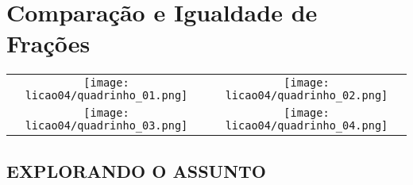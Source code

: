 

\setcounter{chapter}{3}
\chapter{Comparação e Igualdade de Frações }
\setcounter{subsection}{0}
\vspace*{-1.3cm}

\hspace*{-1.3cm}\begin{tabular}{cc}
\texttt{[image: licao04/quadrinho\_01.png]} &
\texttt{[image: licao04/quadrinho\_02.png]} \\
\texttt{[image: licao04/quadrinho\_03.png]} &
\texttt{[image: licao04/quadrinho\_04.png]}
         \end{tabular}


\section{EXPLORANDO O ASSUNTO }

